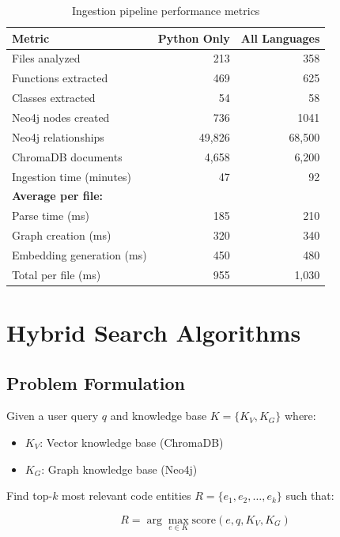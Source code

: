 \documentclass[11pt,letterpaper]{article}
\begin{document}
\begin{table}[h]
\centering
\caption{Ingestion pipeline performance metrics}
\begin{tabular}{@{}lrr@{}}
\toprule
\textbf{Metric} & \textbf{Python Only} & \textbf{All Languages} \\
\midrule
Files analyzed & 213 & 358 \\
Functions extracted & 469 & 625 \\
Classes extracted & 54 & 58 \\
Neo4j nodes created & 736 & 1041 \\
Neo4j relationships & 49,826 & 68,500 \\
ChromaDB documents & 4,658 & 6,200 \\
Ingestion time (minutes) & 47 & 92 \\
\midrule
\textbf{Average per file:} & & \\
Parse time (ms) & 185 & 210 \\
Graph creation (ms) & 320 & 340 \\
Embedding generation (ms) & 450 & 480 \\
Total per file (ms) & 955 & 1,030 \\
\bottomrule
\end{tabular}
\label{tab:ingestion-perf}
\end{table}

\section{Hybrid Search Algorithms}
\label{sec:search}

\subsection{Problem Formulation}

Given a user query $q$ and knowledge base $K = \{K_V, K_G\}$ where:
\begin{itemize}
    \item $K_V$: Vector knowledge base (ChromaDB)
    \item $K_G$: Graph knowledge base (Neo4j)
\end{itemize}

Find top-$k$ most relevant code entities $R = \{e_1, e_2, \ldots, e_k\}$ such that:

\begin{equation}
R = \arg\max_{e \in K} \text{score}(e, q, K_V, K_G)
\end{equation}
\end{document}
